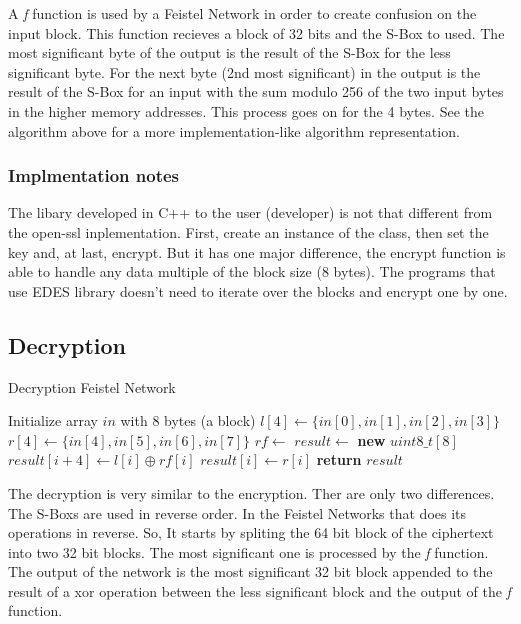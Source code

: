 \documentclass{article} %
\begin{document}
A \textit{f} function is used by a Feistel Network in order to create confusion on the input block.
This function recieves a block of 32 bits and the S-Box to used. The most significant byte of the output is 
the result of the S-Box for the less significant byte. For the next byte (2nd most significant) in the 
output is the result of the S-Box for an input with the sum modulo 256 of the two input bytes in the higher memory addresses.
This process goes on for the 4 bytes. See the algorithm above for a more implementation-like algorithm representation.

\subsubsection{Implmentation notes}
The libary developed in C++ to the user (developer) is not that different from the open-ssl inplementation.
First, create an instance of the class, then set the key and, at last, encrypt. But it has one major difference,
the encrypt function is able to handle any data multiple of the block size (8 bytes). 
The programs that use EDES library doesn't need to iterate over the blocks and encrypt one by one.

\subsection{Decryption}

\begin{algorithm}[H]
  \caption{Decryption Feistel Network}
  \begin{algorithmic}[1]
      \State Initialize array $in$ with 8 bytes (a block)
      \State $l[4] \gets \{in[0], in[1], in[2], in[3]\}$
      \State $r[4] \gets \{in[4], in[5], in[6], in[7]\}$
      \State $rf \gets$ 
      \State $result \gets$ \textbf{new} $uint8\_t[8]$
          \State $result[i + 4] \gets l[i] \oplus rf[i]$
          \State $result[i] \gets r[i]$
      \EndFor
      \State \textbf{return} $result$
  \end{algorithmic}
  \end{algorithm}

The decryption is very similar to the encryption. Ther are only two differences. The S-Boxs are used in reverse order. In the Feistel Networks that does
its operations in reverse. So, It starts by spliting the 64 bit block of the ciphertext into two 32 bit blocks.
The most significant one is processed by the \textit{f} function.
The output of the network is the most significant 32 bit block appended to the result of a xor operation between 
the less significant block and the output of the \textit{f} function.
\end{document}
